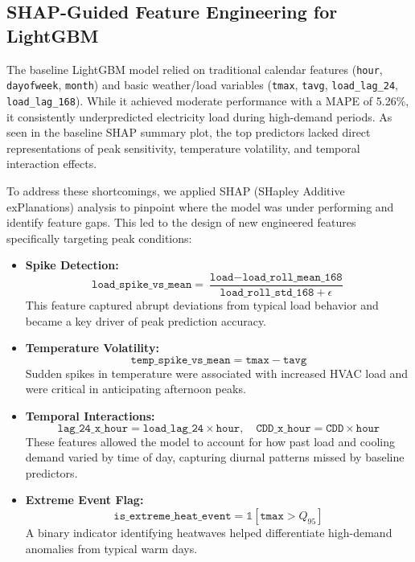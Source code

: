 \documentclass{ifacconf}
\begin{document}
\subsection*{SHAP-Guided Feature Engineering for LightGBM}

The baseline LightGBM model relied on traditional calendar features (\texttt{hour}, \texttt{dayofweek}, \texttt{month}) and basic weather/load variables (\texttt{tmax}, \texttt{tavg}, \texttt{load\_lag\_24}, \texttt{load\_lag\_168}). While it achieved moderate performance with a MAPE of 5.26\%, it consistently underpredicted electricity load during high-demand periods. As seen in the baseline SHAP summary plot, the top predictors lacked direct representations of peak sensitivity, temperature volatility, and temporal interaction effects.

To address these shortcomings, we applied SHAP (SHapley Additive exPlanations) analysis to pinpoint where the model was under performing and identify feature gaps. This led to the design of new engineered features specifically targeting peak conditions:

\begin{itemize}
    \item \textbf{Spike Detection:} 
    \[
        \texttt{load\_spike\_vs\_mean} = \frac{\texttt{load} - \texttt{load\_roll\_mean\_168}}{\texttt{load\_roll\_std\_168} + \epsilon}
    \]
    This feature captured abrupt deviations from typical load behavior and became a key driver of peak prediction accuracy.

    \item \textbf{Temperature Volatility:}
    \[
        \texttt{temp\_spike\_vs\_mean} = \texttt{tmax} - \texttt{tavg}
    \]
    Sudden spikes in temperature were associated with increased HVAC load and were critical in anticipating afternoon peaks.

    \item \textbf{Temporal Interactions:}
    \[
        \texttt{lag\_24\_x\_hour} = \texttt{load\_lag\_24} \times \texttt{hour}, \quad \texttt{CDD\_x\_hour} = \texttt{CDD} \times \texttt{hour}
    \]
    These features allowed the model to account for how past load and cooling demand varied by time of day, capturing diurnal patterns missed by baseline predictors.

    \item \textbf{Extreme Event Flag:}
    \[
        \texttt{is\_extreme\_heat\_event} = \mathbb{1}[\texttt{tmax} > Q_{95}]
    \]
    A binary indicator identifying heatwaves helped differentiate high-demand anomalies from typical warm days.
\end{itemize}
\end{document}
